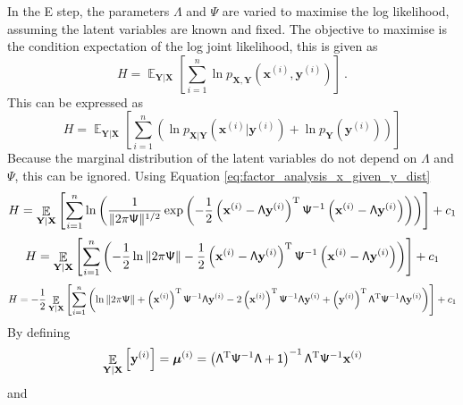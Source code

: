 \documentclass[12pt]{report}
\DeclareMathOperator{\expectation}{\mathbb{E}}
\newcommand{\T}{^\textup{T}}
\newcommand{\vect}[1]{\mathbf{#1}}
\newcommand{\vectGreek}[1]{\boldsymbol{#1}}
\newcommand{\matr}[1]{\mathsf{#1}}
\begin{document}
In the E step, the parameters $\matr{\Lambda}$ and $\matr{\Psi}$ are varied to maximise the log likelihood, assuming the latent variables are known and fixed. The objective to maximise is the condition expectation of the log joint likelihood, this is given as
\begin{equation}
H = \expectation_{\vect{Y}|\vect{X}}\left[\sum_{i=1}^{n}\ln p_{\vect{X},\vect{Y}}\left(\vect{x}^{(i)},\vect{y}^{(i)}\right)\right] \ .
\end{equation}
This can be expressed as
\begin{equation*}
H = \expectation_{\vect{Y}|\vect{X}}\left[
\sum_{i=1}^{n}\left(\ln p_{\vect{X}|\vect{Y}}\left(\vect{x}^{(i)}|\vect{y}^{(i)}\right)+\ln p_{\vect{Y}}\left(\vect{y}^{(i)}\right)\right)
\right]
\end{equation*}
Because the marginal distribution of the latent variables do not depend on $\matr{\Lambda}$ and $\matr{\Psi}$, this can be ignored. Using Equation \eqref{eq:factor_analysis_x_given_y_dist}
\begin{equation*}
H = \expectation_{\vect{Y}|\vect{X}}\left[
\sum_{i=1}^{n}\ln\left(\frac{1}{\|2\pi\matr{\Psi}\|^{1/2}}\exp\left(-\frac{1}{2}\left(\vect{x}^{(i)}-\matr{\Lambda}\vect{y}^{(i)}\right)\T\matr{\Psi}^{-1}\left(\vect{x}^{(i)}-\matr{\Lambda}\vect{y}^{(i)}\right)\right)\right)
\right]
+c_1
\end{equation*}
\begin{equation*}
H = \expectation_{\vect{Y}|\vect{X}}\left[
\sum_{i=1}^{n}\left(-\frac{1}{2}\ln{\|2\pi\matr{\Psi}\|}-\frac{1}{2}\left(\vect{x}^{(i)}-\matr{\Lambda}\vect{y}^{(i)}\right)\T\matr{\Psi}^{-1}\left(\vect{x}^{(i)}-\matr{\Lambda}\vect{y}^{(i)}\right)\right)
\right]
+c_1
\end{equation*}
\begin{equation*}
H = -\frac{1}{2}\expectation_{\vect{Y}|\vect{X}}\left[
\sum_{i=1}^{n}\left(\ln{\|2\pi\matr{\Psi}\|}+\left(\vect{x}^{(i)}\right)\T\matr{\Psi}^{-1}\matr{\Lambda}\vect{y}^{(i)}-2\left(\vect{x}^{(i)}\right)\T\matr{\Psi}^{-1}\matr{\Lambda}\vect{y}^{(i)}+\left(\vect{y}^{(i)}\right)\T\matr{\Lambda}\T\matr{\Psi}^{-1}\matr{\Lambda}\vect{y}^{(i)}\right)
\right]
+c_1
\end{equation*}
By defining
\begin{equation}
\expectation_{\vect{Y}|\vect{X}}\left[\vect{y}^{(i)}\right]=\vectGreek{\mu}^{(i)} = \left(\matr{\Lambda}\T\matr{\Psi}^{-1}\matr{\Lambda}+\matr{1}\right)^{-1}\matr{\Lambda}\T\matr{\Psi}^{-1}\vect{x}^{(i)}
\end{equation}
and
\end{document}
